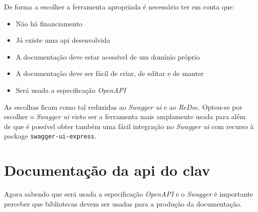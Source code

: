 De forma a escolher a ferramenta apropriada é necessário ter em conta que:
\begin{itemize}
    \item Não há financiamento
    \item Já existe uma \acrshort{api} desenvolvida
    \item A documentação deve estar acessível de um domínio próprio
    \item A documentação deve ser fácil de criar, de editar e de manter
    \item Será usada a especificação \textit{OpenAPI}
\end{itemize}

As escolhas ficam como tal reduzidas ao \textit{Swagger \acrshort{ui}} e ao \textit{ReDoc}. Optou-se por escolher o \textit{Swagger \acrshort{ui}} visto ser a ferramenta mais amplamente usada para além de que é possível obter também uma fácil integração no \textit{Swagger \acrshort{ui}} com recurso à package \texttt{swagger-ui-express}.

\section{Documentação da \acrshort{api} do \acrshort{clav}}

Agora sabendo que será usada a especificação \textit{OpenAPI} e o \textit{Swagger} é importante perceber que bibliotecas devem ser usadas para a produção da documentação. 

